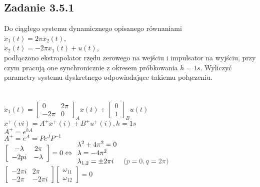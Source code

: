 \pagebreak
\subsection*{Zadanie 3.5.1} {\color{darkgray}
	Do ciągłego systemu dynamicznego opisanego równaniami\\
	$\dot{x}_1(t)=2\pi x_2(t)$,\\
	$\dot{x}_2(t)=-2 \pi x_1(t)+u(t)$,\\
	podłączono ekstrapolator rzędu zerowego na wejściu i impulsator na wyjściu, przy czym pracują one synchronicznie z okresem próbkowania $h = 1 s$. Wyliczyć parametry systemu dyskretnego odpowiadające takiemu połączeniu.\\
}\lineh
\\\\
$\dot{x}_1(t)=\left[ \begin{array}{cc}     0&2\pi\\-2\pi&0    \end{array}\right]_Ax(t)+\left[ \begin{array}{c}     0\\1    \end{array}\right]_Bu(t)$\\
$x^+(vi)=A^+x^+(i)+B^+u^+(i), h=1s$\\
$A^+=e^{hA}$\\
$A^+=e^{A}=Pe^JP^{-1}$\\
$\left[ \begin{array}{cc}     -\lambda&2\pi\\-2pi&-\lambda    \end{array}\right]=0 \Leftrightarrow \begin{array}{l}\lambda^2+4\pi^2=0 \\ \lambda=-4\pi^2 \\ \lambda_{1,2}=\pm 2\pi i\end{array} \begin{array}{l} \\ \\{\color{darkgray} (p=0, q=2\pi)} \end{array}$\\
$\left[ \begin{array}{cc}     -2\pi i& \boxed{2\pi } \\-2\pi&-2\pi i    \end{array}\right]
\left[ \begin{array}{c}   \omega_{11}  \\ \omega_{12}   \end{array}\right] =0$\\
